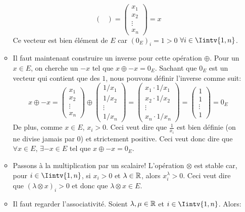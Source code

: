 \begin{exercice}
\begin{enumerate}
\begin{itemize}
$$\begin{pmatrix}
        \end{pmatrix} =
        \begin{pmatrix}
            x_1 \\ x_2 \\ \vdots \\ x_n
        \end{pmatrix} = x$$
        Ce vecteur est bien élément de $E$ car $(0_E)_i = 1 > 0$ $\forall i \in \Iintv{1,n}$.
        \item Il faut maintenant construire un inverse pour cette opération $\oplus$. Pour un $x \in E$, on cherche un $-x$ tel que $x \oplus -x = 0_E$. Sachant que $0_E$ est un vecteur qui contient que des $1$, nous pouvons définir l'inverse comme suit:
        $$x \oplus -x = \begin{pmatrix}
            x_1 \\ x_2 \\ \vdots \\ x_n
        \end{pmatrix} \oplus 
        \begin{pmatrix}
            1/x_1 \\ 1/x_2 \\ \vdots \\ 1/x_n
        \end{pmatrix} =
        \begin{pmatrix}
            x_1 \cdot 1/x_1 \\ x_2 \cdot 1/x_2 \\ \vdots \\ x_n \cdot 1/x_n
        \end{pmatrix} =
        \begin{pmatrix}
            1 \\ 1 \\ \vdots \\ 1
        \end{pmatrix} = 0_E$$
        De plus, comme $x \in E$, $x_i > 0$. Ceci veut dire que $\frac{1}{x_i}$ est bien définie (on ne divise jamais par $0$) et strictement positive. Ceci veut donc dire que $\forall x \in E$, $\exists -x \in E$ tel que $x \oplus -x = 0_E$.
        \item Passons à la multiplication par un scalaire! L'opération $\otimes$ est stable car, pour $i \in \Iintv{1,n}$, si $x_i > 0$ et $\lambda \in \mathbb{R}$, alors $x_i ^\lambda > 0$. Ceci veut dire que $(\lambda \otimes x)_i > 0$ et donc que $\lambda \otimes x \in E$.
        \item Il faut regarder l'associativité. Soient $\lambda, \mu \in \mathbb{R}$ et $i \in \Iintv{1,n}$. Alors:

\end{itemize}
\end{enumerate}
\end{exercice}
